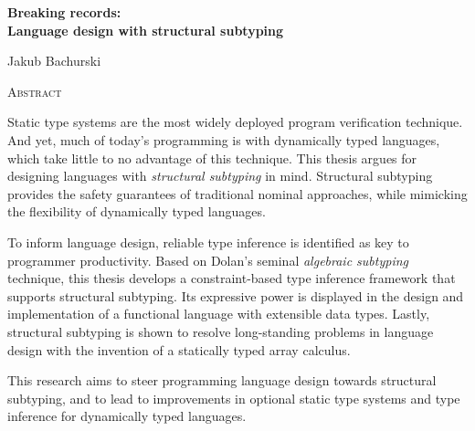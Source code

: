 \vspace*{2cm}
\begin{center}
  \Large
  \textbf{Breaking records: \\ Language design with structural subtyping}
\end{center}
\ifanonymised\else
\vspace{0.5cm}
\begin{center}
  \Large Jakub Bachurski
\end{center}
\fi
\vspace{1.5cm}
\begin{center}
  \Large
  \textsc{Abstract}
\end{center}
\vspace{0.2cm}
%
\begin{center}
\begin{minipage}{0.55\textwidth}
    \setlength{\parindent}{1em}
    Static type systems are the most widely deployed program verification technique. 
    And yet, much of today's programming is with dynamically typed languages, which take little to no advantage of this technique. 
    This thesis argues for designing languages with \emph{structural subtyping} in mind. Structural subtyping provides the safety guarantees of traditional nominal approaches, while mimicking the flexibility of dynamically typed languages. 

    To inform language design, reliable type inference is identified as key to programmer productivity. Based on Dolan's seminal \emph{algebraic subtyping} technique, this thesis develops a constraint-based type inference framework that supports structural subtyping. Its expressive power is displayed in the design and implementation of a functional language with extensible data types. Lastly, structural subtyping is shown to resolve long-standing problems in language design with the invention of a statically typed array calculus.

    This research aims to steer programming language design towards structural subtyping, and to lead to improvements in optional static type systems and type inference for dynamically typed languages.
\end{minipage}
\end{center}